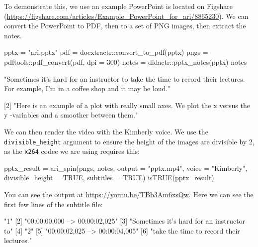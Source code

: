 To demonstrate this, we use an example PowerPoint is located on Figshare
(\url{https://figshare.com/articles/Example_PowerPoint_for_ari/8865230}).
We can convert the PowerPoint to PDF, then to a set of PNG images, then
extract the notes.

\begin{Schunk}
\begin{Sinput}
pptx = "ari.pptx"
pdf = docxtractr::convert_to_pdf(pptx)
pngs = pdftools::pdf_convert(pdf, dpi = 300)
notes = didactr::pptx_notes(pptx)
notes
\end{Sinput}
\end{Schunk}

\begin{Schunk}
\begin{Soutput}
[1] "Sometimes it’s hard for an instructor to take the time to record their lectures.
For example, I’m in a coffee shop and it may be loud."

[2] "Here is an example of a plot with really small axes.  We plot the x versus the y
-variables and a smoother between them."
\end{Soutput}
\end{Schunk}

We can then render the video with the Kimberly voice. We use the
\texttt{divisible\_height} argument to ensure the height of the images
are divisible by 2, as the \texttt{x264} codec we are using requires
this:

\begin{Schunk}
\begin{Sinput}
pptx_result = ari_spin(pngs, notes, output = "pptx.mp4", voice = "Kimberly",
    divisible_height = TRUE, subtitles = TRUE)
isTRUE(pptx_result)
\end{Sinput}
\end{Schunk}

You can see the output at \url{https://youtu.be/TBb3Am6xsQw}. Here we
can see the first few lines of the subtitle file:

\begin{Schunk}
\begin{Soutput}
[1] "1"                                       
[2] "00:00:00,000 --> 00:00:02,025"           
[3] "Sometimes it’s hard for an instructor to"
[4] "2"                                       
[5] "00:00:02,025 --> 00:00:04,005"           
[6] "take the time to record their lectures." 
\end{Soutput}
\end{Schunk}

